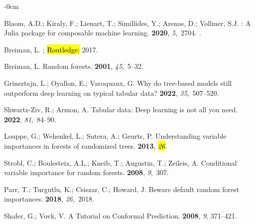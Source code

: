 \documentclass[remotesensing,article,accept,pdftex,moreauthors]{Definitions/mdpi}
\begin{document}
\begin{adjustwidth}{-\extralength}{0cm}
\begin{thebibliography}{999}
Blaom, A.D.; Kiraly, F.; Lienart, T.; Simillides, Y.; Arenas, D.; Vollmer, S.J.
: A Julia package for composable machine learning.
 {\bf 2020}, {\em 5},~2704.
.

Breiman, L.
; \hl{Routledge:} %
  2017.

Breiman, L.
\newblock Random forests.
 {\bf 2001}, {\em 45},~5--32.

Grinsztajn, L.; Oyallon, E.; Varoquaux, G.
\newblock Why do tree-based models still outperform deep learning on typical
  tabular data?
 {\bf 2022},
  {\em 35},~507--520.

Shwartz-Ziv, R.; Armon, A.
\newblock Tabular data: Deep learning is not all you need.
 {\bf 2022}, {\em 81},~84--90.

Louppe, G.; Wehenkel, L.; Sutera, A.; Geurts, P.
\newblock Understanding variable importances in forests of randomized trees.
 {\bf 2013},
  {\em \hl{26}}.


Strobl, C.; Boulesteix, A.L.; Kneib, T.; Augustin, T.; Zeileis, A.
\newblock Conditional variable importance for random forests.
 {\bf 2008}, {\em 9},~307.

Parr, T.; Turgutlu, K.; Csiszar, C.; Howard, J.
\newblock Beware default random forest importances.
 {\bf 2018}, {\em 26},~2018.

Shafer, G.; Vovk, V.
\newblock A Tutorial on Conformal Prediction.
 {\bf 2008}, {\em 9}, 371--421.


\end{thebibliography}
\end{adjustwidth}
\end{document}
